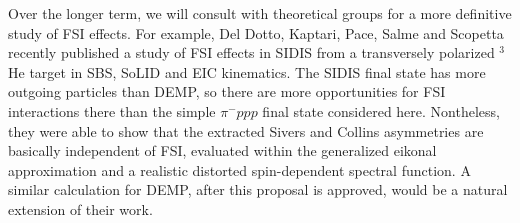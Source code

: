 Over the longer term, we will consult with theoretical groups for a more
definitive study of FSI effects.  For example, Del Dotto, Kaptari, Pace,
Salme and Scopetta recently published a study of FSI effects in SIDIS from a
transversely polarized $^3$He target \cite{dotto} in SBS, SoLID and EIC
kinematics.  The SIDIS final state has more outgoing particles than DEMP, so
there are more opportunities for FSI interactions there than the simple $\pi^-
ppp$ final state considered here.  Nontheless, they were able to show that the
extracted Sivers and Collins asymmetries are basically independent of FSI,
evaluated within the generalized eikonal approximation and a realistic
distorted spin-dependent spectral function.  A similar calculation for DEMP,
after this proposal is approved, would be a natural extension of their work.
